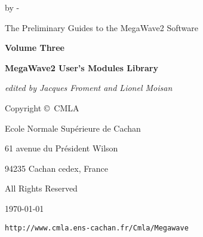%
%


\voffset 0cm
\textheight 22.0cm     
\topmargin -1cm     
\headsep 2cm           
\footskip 2cm       
\hoffset 0cm
\textwidth 160mm       
\marginparwidth 0mm    
\hsize \textwidth      
\advance \hsize by -\marginparwidth
\oddsidemargin 0cm
\evensidemargin \oddsidemargin %



\parindent 0mm
\parskip 0mm
\def\httpmw{{\tt http://www.cmla.ens-cachan.fr/Cmla/Megawave}}

\thispagestyle{empty}

\begin{center}
The Preliminary Guides to the MegaWave2 Software

\vspace{2cm}

{\Large\bf Volume Three}

\vspace{3cm}

{\LARGE\bf MegaWave2 User's Modules Library}

\vspace{1cm}

{\large\em edited by Jacques Froment and Lionel Moisan}

\vspace{7cm}

{\large
Copyright \copyright\ CMLA

Ecole Normale Sup\'erieure de Cachan 

61 avenue du Pr\'esident Wilson 

94235 Cachan cedex, France

All Rights Reserved

\vspace{2cm}

\today

\vspace{1cm}

\httpmw

}


\end{center}
\newpage

\pagestyle{myheadings}






